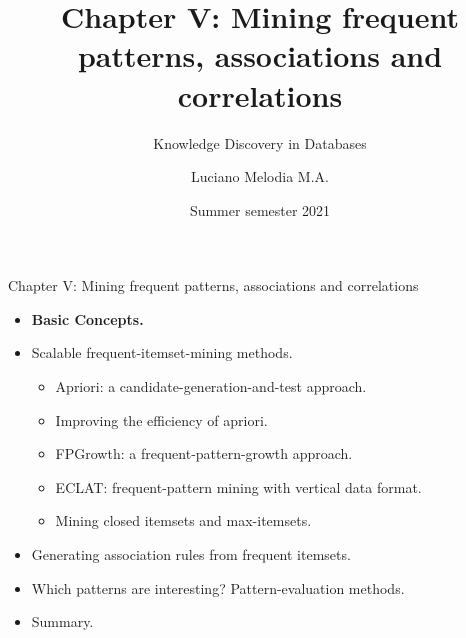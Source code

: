 \documentclass[aspectratio=169,t]{beamer}
\title[KDD]{Chapter V: Mining frequent patterns, associations and correlations}
\subtitle{Knowledge Discovery in Databases}
\author[L.~Melodia]{Luciano Melodia M.A.}
\institute[Department]{Evolutionary Data Management, Friedrich-Alexander University Erlangen-Nürnberg}
\date{Summer semester 2021}
\begin{document}
  \maketitle

  { 
    \begin{frame}{Chapter V: Mining frequent patterns, associations and correlations}
        \begin{itemize}
            \item \textbf{Basic Concepts.}
            \item Scalable frequent-itemset-mining methods.
            \begin{itemize}
              \item Apriori: a candidate-generation-and-test approach.
              \item Improving the efficiency of apriori.
              \item FPGrowth:  a frequent-pattern-growth approach.
              \item ECLAT: frequent-pattern mining with vertical data format.
              \item Mining closed itemsets and max-itemsets.
            \end{itemize}
            \item Generating association rules from frequent itemsets.
            \item Which patterns are interesting? Pattern-evaluation methods.
            \item Summary.
        \end{itemize}
    \end{frame}
  }
\end{document}
